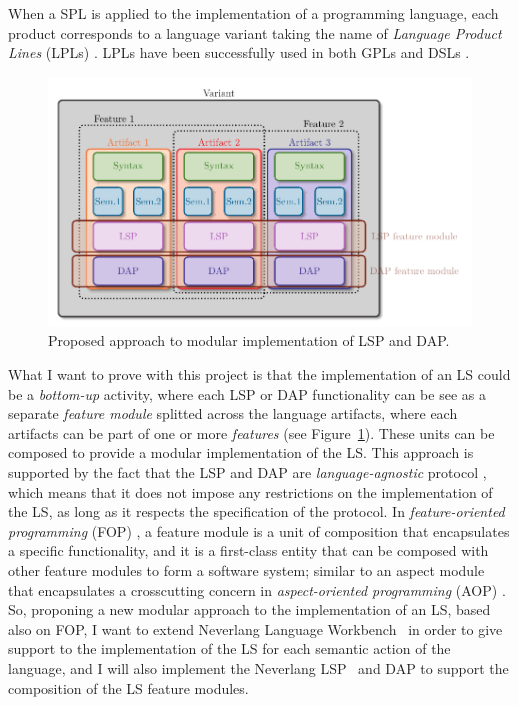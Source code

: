 When a SPL is applied to the implementation of a programming language, each product corresponds to a language variant \cite{Cazzola15f} taking the name of \textit{Language Product Lines} (LPLs) \cite{Cazzola15f}. LPLs have been successfully used in both GPLs \cite{Cazzola16, Cazzola16i, Cazzola15f} and DSLs \cite{Haugen08, Liebig13, Cazzola14e, Wende09, White09}.
\hfill \break
\begin{figure}[t]
    \centering
    \includegraphics[width=0.9\linewidth]{figs/module_with_lsp.pdf}
    \caption{Proposed approach to modular implementation of LSP and DAP.}
    \label{fig:proposed}
\end{figure}
What I want to prove with this project is that the implementation of an LS could be a \textit{bottom-up} activity, where each LSP or DAP functionality can be see as a separate \textit{feature module} \cite{Batory04, Kastner11} splitted across the language artifacts, where each artifacts can be part of one or more \textit{features} (see Figure~\ref{fig:proposed}). These units can be composed to provide a modular implementation of the LS. This approach is supported by the fact that the LSP and DAP are \textit{language-agnostic} protocol \cite{Niephaus20, Rodriguez-Echeverria18}, which means that it does not impose any restrictions on the implementation of the LS, as long as it respects the specification of the protocol.
In \textit{feature-oriented programming} (FOP) \cite{Apel13, Czarnecki04, Prehofer01}, a feature module is a unit of composition that encapsulates a specific functionality, and it is a first-class entity that can be composed with other feature modules to form a software system; similar to an aspect module that encapsulates a crosscutting concern in \textit{aspect-oriented programming} (AOP) \cite{Kiczales01, Kiczales97, Laddad03}.
So, proponing a new modular approach to the implementation of an LS, based also on FOP, I want to extend Neverlang Language Workbench~\cite{Cazzola15c, Cazzola14c} in order to give support to the implementation of the LS for each semantic action of the language, and I will also implement the Neverlang LSP~\cite{Cazzola19} and DAP to support the composition of the LS feature modules.
